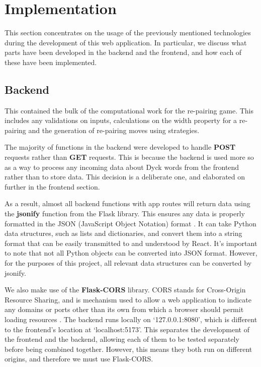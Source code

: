 \section{Implementation}
This section concentrates on the usage of the previously mentioned technologies during the development of this web application. In particular, we discuss what parts have been developed in the backend and the frontend, and how each of these have been implemented.

\subsection{Backend}
This contained the bulk of the computational work for the re-pairing game. This includes any validations on inputs, calculations on the width property for a re-pairing and the generation of re-pairing moves using strategies.

The majority of functions in the backend were developed to handle \textbf{POST} requests rather than \textbf{GET} requests. This is because the backend is used more so as a way to process any incoming data about Dyck words from the frontend rather than to store data. This decision is a deliberate one, and elaborated on further in the frontend section.

As a result, almost all backend functions with app routes will return data using the \textbf{jsonify} function from the Flask library. This ensures any data is properly formatted in the JSON (JavaScript Object Notation) format \cite{jsonify}. It can take Python data structures, such as lists and dictionaries, and convert them into a string format that can be easily transmitted to and understood by React. It's important to note that not all Python objects can be converted into JSON format. However, for the purposes of this project, all relevant data structures can be converted by jsonify.

We also make use of the \textbf{Flask-CORS} library. CORS stands for Cross-Origin Resource Sharing, and is mechanism used to allow a web application to indicate any domains or ports other than its own from which a browser should permit loading resources \cite{flaskCORS}. The backend runs locally on {`127.0.0.1:8080'}, which is different to the frontend's location at {`localhost:5173'}. This separates the development of the frontend and the backend, allowing each of them to be tested separately before being combined together. However, this means they both run on different origins, and therefore we must use Flask-CORS. 

